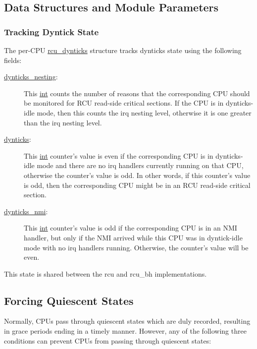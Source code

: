 \subsection{Data Structures and Module Parameters}
\label{app:rcuimpl:rcutreewt:Data Structures and Module Parameters}


\subsubsection{Tracking Dyntick State}
\label{app:rcuimpl:rcutreewt:Tracking Dyntick State}

The per-CPU \url{rcu_dynticks} structure tracks dynticks state using the
following fields:

\begin{description}
\item[\url{dynticks_nesting}:]
	This \url{int} counts the number of reasons that the corresponding
	CPU should be monitored for RCU read-side critical sections.
	If the CPU is in dynticks-idle mode, then this counts the
	irq nesting level, otherwise it is one greater than the
	irq nesting level.
\item[\url{dynticks}:]
	This \url{int} counter's value is even if the corresponding CPU is
	in dynticks-idle mode and there are no irq handlers currently
	running on that CPU, otherwise the counter's value is odd.
	In other words, if this counter's value is odd, then the
	corresponding CPU might be in an RCU read-side critical section.
\item[\url{dynticks_nmi}:]
	This \url{int} counter's value is odd if the corresponding CPU is
	in an NMI handler, but only if the NMI arrived while this
	CPU was in dyntick-idle mode with no irq handlers running.
	Otherwise, the counter's value will be even.
\end{description}

This state is shared between the rcu and rcu\_bh implementations.

\subsection{Forcing Quiescent States}
\label{app:rcuimpl:rcutreewt:Forcing Quiescent States}

Normally, CPUs pass through quiescent states which are duly recorded,
resulting in grace periods ending in a timely manner.
However, any of the following three conditions can prevent CPUs from
passing through quiescent states:

